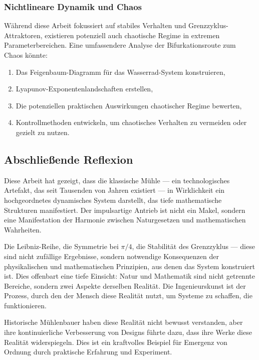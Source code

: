 \documentclass[a4paper,12pt]{article}
\theoremstyle{definition}
\begin{document}
\subsubsection*{Nichtlineare Dynamik und Chaos}

Während diese Arbeit fokussiert auf stabiles Verhalten und Grenzzyklus-Attraktoren, existieren potenziell auch chaotische Regime in extremen Parameterbereichen. Eine umfassendere Analyse der Bifurkationsroute zum Chaos könnte:
\begin{enumerate}
  \item Das Feigenbaum-Diagramm für das Wasserrad-System konstruieren,
  \item Lyapunov-Exponentenlandschaften erstellen,
  \item Die potenziellen praktischen Auswirkungen chaotischer Regime bewerten,
  \item Kontrollmethoden entwickeln, um chaotisches Verhalten zu vermeiden oder gezielt zu nutzen.
\end{enumerate}

\subsection{Abschließende Reflexion}

Diese Arbeit hat gezeigt, dass die klassische Mühle --- ein technologisches Artefakt, das seit Tausenden von Jahren existiert --- in Wirklichkeit ein hochgeordnetes dynamisches System darstellt, das tiefe mathematische Strukturen manifestiert. Der impulsartige Antrieb ist nicht ein Makel, sondern eine Manifestation der Harmonie zwischen Naturgesetzen und mathematischen Wahrheiten.

Die Leibniz-Reihe, die Symmetrie bei $\pi/4$, die Stabilität des Grenzzyklus --- diese sind nicht zufällige Ergebnisse, sondern notwendige Konsequenzen der physikalischen und mathematischen Prinzipien, aus denen das System konstruiert ist. Dies offenbart eine tiefe Einsicht: Natur und Mathematik sind nicht getrennte Bereiche, sondern zwei Aspekte derselben Realität. Die Ingenieurskunst ist der Prozess, durch den der Mensch diese Realität nutzt, um Systeme zu schaffen, die funktionieren.

Historische Mühlenbauer haben diese Realität nicht bewusst verstanden, aber ihre kontinuierliche Verbesserung von Designs führte dazu, dass ihre Werke diese Realität widerspiegeln. Dies ist ein kraftvolles Beispiel für Emergenz von Ordnung durch praktische Erfahrung und Experiment.
\end{document}
